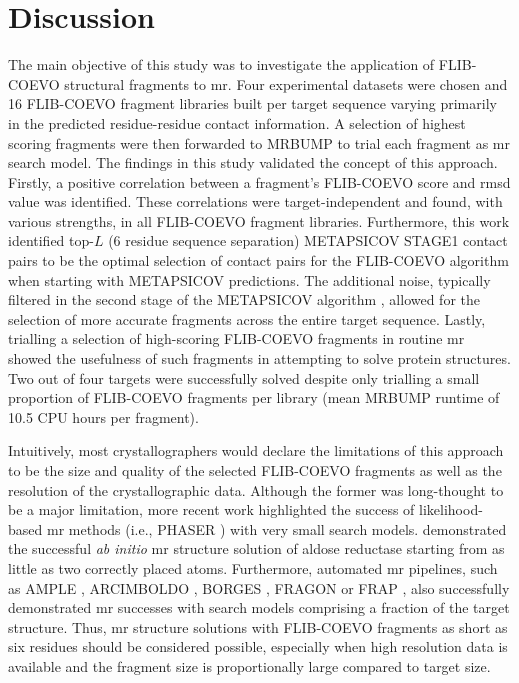 \section{Discussion}
The main objective of this study was to investigate the application of FLIB-COEVO structural fragments to \gls{mr}. Four experimental datasets were chosen and 16 FLIB-COEVO fragment libraries built per target sequence varying primarily in the predicted residue-residue contact information. A selection of highest scoring fragments were then forwarded to MRBUMP to trial each fragment as \gls{mr} search model. The findings in this study validated the concept of this approach. Firstly, a positive correlation between a fragment's FLIB-COEVO score and \gls{rmsd} value was identified. These correlations were target-independent and found, with various strengths, in all FLIB-COEVO fragment libraries. Furthermore, this work identified top-$L$ (6 residue sequence separation) METAPSICOV STAGE1 contact pairs to be the optimal selection of contact pairs for the FLIB-COEVO algorithm when starting with METAPSICOV predictions. The additional noise, typically filtered in the second stage of the METAPSICOV algorithm \cite{Jones2015-vq}, allowed for the selection of more accurate fragments across the entire target sequence. Lastly, trialling a selection of high-scoring FLIB-COEVO fragments in routine \gls{mr} showed the usefulness of such fragments in attempting to solve protein structures. Two out of four targets were successfully solved despite  only trialling a small proportion of FLIB-COEVO fragments per library (mean MRBUMP runtime of 10.5 CPU hours per fragment).

Intuitively, most crystallographers would declare the limitations of this approach to be the size and quality of the selected FLIB-COEVO fragments as well as the resolution of the crystallographic data. Although the former was long-thought to be a major limitation, more recent work highlighted the success of likelihood-based \gls{mr} methods (i.e., PHASER \cite{McCoy2007-mp}) with very small search models. \textcite{McCoy2017-cz} demonstrated the successful \textit{ab initio} \gls{mr} structure solution of aldose reductase starting from as little as two correctly placed atoms. Furthermore, automated \gls{mr} pipelines, such as AMPLE \cite{Bibby2012-lm}, ARCIMBOLDO \cite{Rodriguez2012-ad}, BORGES \cite{Sammito2013-ug}, FRAGON \cite{Jenkins2018-gf} or FRAP \cite{Shrestha2015-zb}, also successfully demonstrated \gls{mr} successes with search models comprising a fraction of the target structure. Thus, \gls{mr} structure solutions with FLIB-COEVO fragments as short as six residues should be considered possible, especially when high resolution data is available and the fragment size is proportionally large compared to target size.

